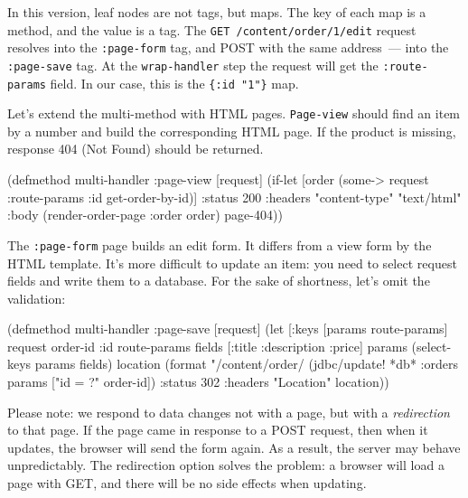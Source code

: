 In this version, leaf nodes are not tags, but maps. The key of each map is a method, and the value is a tag. The \verb|GET /content/order/1/edit| request resolves into
the \verb|:page-form| tag, and POST with the same address~--- into the \verb|:page-save| tag.  At the \verb|wrap-handler| step the request will get the \verb|:route-params| field. In our case, this is the \verb|{:id "1"}| map.


Let's extend the multi-method with HTML pages. \verb|Page-view| should find an item by a number and build the corresponding HTML page. If the product is missing, response 404 (Not Found) should be returned.

\begin{english}
\begin{clojure}
(defmethod multi-handler :page-view
[request]
(if-let [order (some-> request
:route-params
:id
get-order-by-id)]
{:status 200
:headers {"content-type" "text/html"}
:body (render-order-page {:order order})}
page-404))
\end{clojure}
\end{english}

The \verb|:page-form| page builds an edit form. It differs from a view form by the HTML template. It's more difficult to update an item: you need to select request fields and write them to a database. For the sake of shortness, let's omit the validation:

\begin{english}
\begin{clojure}
(defmethod multi-handler :page-save
[request]
(let [{:keys [params route-params]} request
{order-id :id} route-params
fields [:title :description :price]
params (select-keys params fields)
location (format "/content/order/%
(jdbc/update! *db* :orders params ["id = ?" order-id])
{:status 302
:headers {"Location" location}}))
\end{clojure}
\end{english}


Please note: we respond to data changes not with a page, but with a  \emph{redirection} to that page. If the page came in response to a POST request, then when it updates, the browser will send the form again. As a result, the server may behave unpredictably. The redirection option solves the problem: a browser will load a page with GET, and there will be no side effects when updating.

